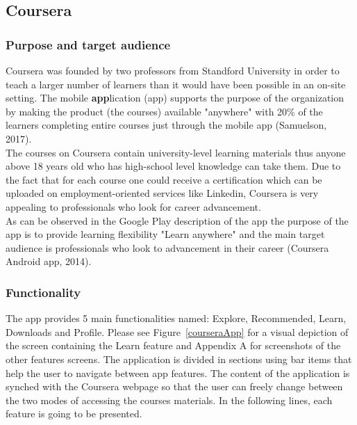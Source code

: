 \documentclass[version=last,fontsize=13pt]{scrartcl}
\begin{document}
	\subsection{Coursera}
		\subsubsection{Purpose and target audience}		   
		Coursera was founded by two professors from Standford University in order to teach a larger number of learners than it would have been possible in an on-site setting. The mobile \textbf{app}lication (app) supports the purpose of the organization by making the product (the courses) available "anywhere" with 20\% of the learners completing entire courses just through the mobile app (Samuelson, 2017).\\
		\indent
		The courses on Coursera contain university-level learning materials thus anyone above 18 years old who has high-school level knowledge can take them. Due to the fact that for each course one could receive a certification which can be uploaded on employment-oriented services like Linkedin, Coursera is very appealing to professionals who look for career advancement.\\ 
		\indent
		As can be observed in the Google Play description of the app the purpose of the app is to provide learning flexibility "Learn anywhere" and the main target audience is professionals who look  to advancement in their career (Coursera Android app, 2014).

		\subsubsection{Functionality}
		The app provides 5 main functionalities named: Explore, Recommended, Learn, Downloads and Profile. Please see Figure~\ref{courseraApp} for a visual depiction of the screen containing the Learn feature  and Appendix A for screenshots of the other features screens. The application is divided in sections using bar items that help the user to navigate between app features. The content of the application is synched with the Coursera webpage so that the user can freely change between the two modes of accessing the courses materials. In the following lines, each feature is going to be presented.
\end{document}

